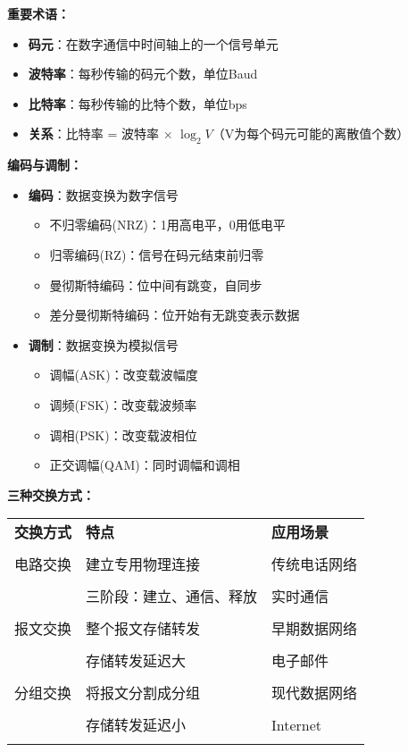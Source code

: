 \documentclass[lang=cn,newtx,10pt,scheme=chinese]{../../elegantbook}
\begin{document}
\textbf{重要术语：}
\begin{itemize}
  \item \textbf{码元}：在数字通信中时间轴上的一个信号单元
  \item \textbf{波特率}：每秒传输的码元个数，单位Baud
  \item \textbf{比特率}：每秒传输的比特个数，单位bps
  \item \textbf{关系}：比特率 = 波特率 × $\log_2V$（V为每个码元可能的离散值个数）
\end{itemize}

\textbf{编码与调制：}
\begin{itemize}
  \item \textbf{编码}：数据变换为数字信号
    \begin{itemize}
      \item 不归零编码(NRZ)：1用高电平，0用低电平
      \item 归零编码(RZ)：信号在码元结束前归零
      \item 曼彻斯特编码：位中间有跳变，自同步
      \item 差分曼彻斯特编码：位开始有无跳变表示数据
    \end{itemize}
  \item \textbf{调制}：数据变换为模拟信号
    \begin{itemize}
      \item 调幅(ASK)：改变载波幅度
      \item 调频(FSK)：改变载波频率  
      \item 调相(PSK)：改变载波相位
      \item 正交调幅(QAM)：同时调幅和调相
    \end{itemize}
\end{itemize}

\textbf{三种交换方式：}
\begin{longtable}{@{}p{3cm}p{4cm}p{6cm}@{}}
\toprule
\textbf{交换方式} & \textbf{特点} & \textbf{应用场景} \\\\ \midrule
\endhead

电路交换 & 建立专用物理连接 & 传统电话网络 \\\\
& 三阶段：建立、通信、释放 & 实时通信 \\\\
\hline

报文交换 & 整个报文存储转发 & 早期数据网络 \\\\
& 存储转发延迟大 & 电子邮件 \\\\
\hline

分组交换 & 将报文分割成分组 & 现代数据网络 \\\\
& 存储转发延迟小 & Internet \\\\

\bottomrule
\end{longtable}
\end{document}
